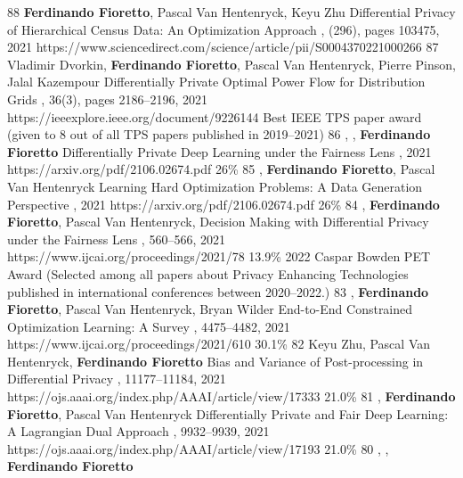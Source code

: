 \begin{pubs}
\journalentry
	{88} %
		{\textbf{Ferdinando Fioretto}, Pascal Van Hentenryck, Keyu Zhu}
		{Differential Privacy of Hierarchical Census Data: An Optimization Approach}
		{\AIJ, (296), pages 103475, 2021}
		{https://www.sciencedirect.com/science/article/pii/S0004370221000266}
\journalentryAwd
	{87} %
		{Vladimir Dvorkin, {\bf Ferdinando Fioretto}, Pascal Van Hentenryck, Pierre Pinson, Jalal Kazempour}
		{Differentially Private Optimal Power Flow for Distribution Grids}
		{\TPS, 36(3), pages 2186--2196, 2021}
		{https://ieeexplore.ieee.org/document/9226144}
		{Best IEEE TPS paper award}
		{(given to 8 out of all TPS papers published in 2019--2021)}
\confentry 
	{86} %
	{, , {\bf Ferdinando Fioretto}}
	{Differentially Private Deep Learning under the Fairness Lens}
	{\procNeurIPS, 2021}
	{https://arxiv.org/pdf/2106.02674.pdf}
	{26\%} %
\confentry 
	{85} %
	{, {\bf Ferdinando Fioretto}, Pascal Van Hentenryck}
	{Learning Hard Optimization Problems: A Data Generation Perspective}
	{\procNeurIPS, 2021}
	{https://arxiv.org/pdf/2106.02674.pdf}
	{26\%} %
\confentryAwd 
	{84} %
	{, {\bf Ferdinando Fioretto}, Pascal Van Hentenryck, }
	{Decision Making with Differential Privacy under the Fairness Lens}
	{\procIJCAI, 560--566, 2021}
	{https://www.ijcai.org/proceedings/2021/78}
	{13.9\%} %
	{2022 Caspar Bowden PET Award}
	{(Selected among all papers about Privacy Enhancing Technologies published in international conferences between 2020--2022.)}
\confentry 
	{83} %
	{, {\bf Ferdinando Fioretto}, Pascal Van Hentenryck, Bryan Wilder}
	{End-to-End Constrained Optimization Learning: A Survey}
	{\procIJCAI, 4475--4482, 2021}
	{https://www.ijcai.org/proceedings/2021/610}
	{30.1\%}
\confentry 
	{82} %
	{Keyu Zhu, Pascal Van Hentenryck, {\bf Ferdinando Fioretto}}
	{Bias and Variance of Post-processing in Differential Privacy}
	{\procAAAI, 11177--11184, 2021}
	{https://ojs.aaai.org/index.php/AAAI/article/view/17333}
    {21.0\%} %
\confentry 
	{81} %
	{, {\bf Ferdinando Fioretto}, Pascal Van Hentenryck}
	{Differentially Private and Fair Deep Learning: A Lagrangian Dual Approach}
	{\procAAAI, 9932--9939, 2021}
	{https://ojs.aaai.org/index.php/AAAI/article/view/17193}
    {21.0\%} %
\confentry
    {80} %
    {, , {\bf Ferdinando Fioretto}}

\end{pubs}
